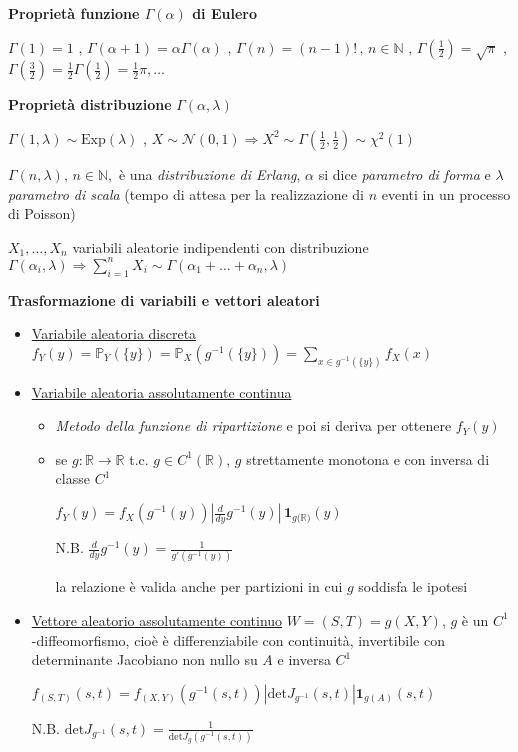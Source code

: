 \documentclass[openany]{book} %
\begin{document}
\textbf{Proprietà funzione $\Gamma(\alpha)$ di Eulero} 

$\Gamma(1)=1$ , \quad 
$\Gamma(\alpha+1) = \alpha\Gamma(\alpha)$ , \quad
$\Gamma(n)=(n-1)!\,,\,n\in \mathbb{N}$ , \quad 
$\Gamma(\frac{1}{2})=\sqrt {\pi}$ , \quad 
$\Gamma(\frac{3}{2})=\frac{1}{2}\Gamma(\frac{1}{2})=\frac{1}{2}\pi,\dots$

\textbf{Proprietà distribuzione} $\Gamma(\alpha,\lambda)$

$\Gamma(1,\lambda) \sim \text{Exp}(\lambda)$ , \quad $X\sim \mathcal {N}(0,1)\Rightarrow X^2\sim\Gamma(\frac{1}{2},\frac{1}{2})\sim\chi^2(1)$ 

$\Gamma(n,\lambda),\,n\in \mathbb{N},$ è una \textit{distribuzione di Erlang}, $\alpha$ si dice \textit{parametro di forma} e $\lambda$ \textit{parametro di scala} (tempo di attesa per la realizzazione di $n$ eventi in un processo di Poisson)

$X_1,\dots,X_n$ variabili aleatorie indipendenti con distribuzione $\Gamma(\alpha_i,\lambda)\Rightarrow \sum_{i=1}^nX_i\sim\Gamma(\alpha_1+\dots+\alpha_n,\lambda)$

\pagebreak

\textbf{Trasformazione di variabili e vettori aleatori}

\begin{itemize}

\item \underline{Variabile aleatoria discreta} $f_Y(y)=\mathbb{P}_Y(\{y\})=\mathbb{P}_X(g^{-1}(\{y\}))=\sum_{x\in g^{-1}(\{y\})}f_X(x)$
 
\item \underline{Variabile aleatoria assolutamente continua} 

\begin{itemize}

\item \textit{Metodo della funzione di ripartizione} e poi si deriva per ottenere $f_Y(y)$

\item se $g:\mathbb{R}\rightarrow \mathbb{R}$ t.c. $g\in C^1(\mathbb{R})$, $g$ strettamente monotona e con inversa di classe $C^1$

$f_Y(y)=f_X(g^{-1}(y))|\frac{d}{dy}g^{-1}(y)|\,\boldsymbol{1}_{g(\mathbb{R)}}(y)$

N.B. $\frac{d}{dy}g^{-1}(y) = \frac{1}{g'(g^{-1}(y))}$

la relazione è valida anche per partizioni in cui $g$ soddisfa le ipotesi

\end{itemize}

\item \underline{Vettore aleatorio assolutamente continuo} $W = (S,T) = g(X,Y)$, $g$ è un $C^1$-diffeomorfismo, cioè è differenziabile con continuità, invertibile con determinante Jacobiano non nullo su $A$ e inversa $C^1$

$f_{(S,T)}(s,t)=f_{(X,Y)}(g^{-1}(s,t))\left|\text{det} J_{g^{-1}}(s,t)\right|\boldsymbol{1}_{g(A)}(s,t)$

N.B. $\text{det}J_{g^{-1}}(s,t)=\frac{1}{\text{det}J_g(g^{-1}(s,t))}$

\end{itemize}
\end{document}
